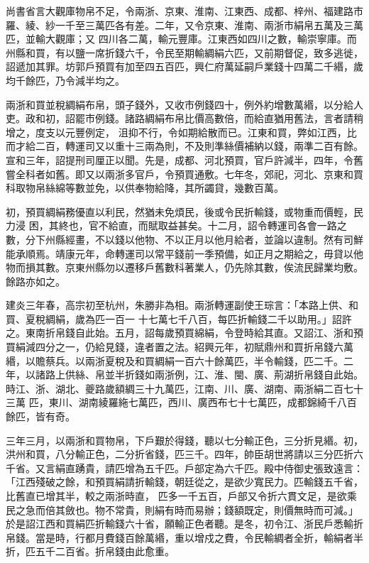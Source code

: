 \begin{pinyinscope}
 尚書省言大觀庫物帛不足，令兩浙、京東、淮南、江東西、成都、梓州、福建路市羅、綾、紗一千至三萬匹各有差。二年，又令京東、淮南、兩浙市絹帛五萬及三萬匹，並輸大觀庫；又
 四川各二萬，輸元豐庫。江東西如四川之數，輸崇寧庫。而州縣和買，有以鹽一席折錢六千，令民至期輸綢絹六匹，又前期督促，致多逃徙，詔遞加其罪。坊郭戶預買有加至四五百匹，興仁府萬延嗣戶業錢十四萬二千緡，歲均千餘匹，乃令減半均之。



 兩浙和買並稅綢絹布帛，頭子錢外，又收市例錢四十，例外約增數萬緡，以分給人吏。政和初，詔罷市例錢。諸路綢絹布帛比價高數倍，而給直猶用舊法，言者請稍增之，度支以元豐例定，
 沮抑不行，令如期給散而已。江東和買，弊如江西，比而才給二百，轉運司又以重十三兩為則，不及則準絲價補納以錢，兩準二百有餘。宣和三年，詔提刑司厘正以聞。先是，成都、河北預買，官戶許減半，四年，令舊嘗全科者如舊。即又以兩浙多官戶，令預買通敷。七年冬，郊祀，河北、京東和買科取物帛絲綿等數並免，以供奉物給降，其所蠲貸，幾數百萬。



 初，預買綢絹務優直以利民，然猶未免煩民，後或令民折輸錢，或物重而價輕，民力浸
 困，其終也，官不給直，而賦取益甚矣。十二月，詔令轉運司各會一路之數，分下州縣經畫，不以錢以他物、不以正月以他月給者，並論以違制。然有司鮮能承順焉。靖康元年，命轉運司以常平錢前一季預備，如正月之期給之，毋貸以他物而損其數。京東州縣勿以遷移戶舊數科著業人，仍先除其數，俟流民歸業均敷。餘路亦如之。



 建炎三年春，高宗初至杭州，朱勝非為相。兩浙轉運副使王琮言：「本路上供、和買、夏稅綢絹，歲為匹一百一
 十七萬七千八百，每匹折輸錢二千以助用。」詔許之。東南折帛錢自此始。五月，詔每歲預買綿絹，令登時給其直。又詔江、浙和預買絹減四分之一，仍給見錢，違者置之法。紹興元年，初賦鼎州和買折帛錢六萬緡，以贍蔡兵。以兩浙夏稅及和買綢絹一百六十餘萬匹，半令輸錢，匹二千。二年，以諸路上供絲、帛並半折錢如兩浙例，江、淮、閩、廣、荊湖折帛錢自此始。時江、浙、湖北、夔路歲額綢三十九萬匹，江南、川、廣、湖南、兩浙絹二百七十三萬
 匹，東川、湖南綾羅絁七萬匹，西川、廣西布七十七萬匹，成都錦綺千八百餘匹，皆有奇。



 三年三月，以兩浙和買物帛，下戶艱於得錢，聽以七分輸正色，三分折見緡。初，洪州和買，八分輸正色，二分折省錢，匹三千。四年，帥臣胡世將請以三分匹折六千省。又言絹直踴貴，請匹增為五千匹。戶部定為六千匹。殿中侍御史張致遠言：「江西殘破之餘，和預買絹請折輸錢，朝廷從之，是欲少寬民力。匹輸錢五千省，比舊直已增其半，較之兩浙時直，
 匹多一千五百，戶部又令折六貫文足，是欲乘民之急而倍其斂也。物不常貴，則絹有時而易辦；錢額既定，則價無時而可減。」於是詔江西和買絹匹折輸錢六十省，願輸正色者聽。是冬，初令江、浙民戶悉輸折帛錢。當是時，行都月費錢百餘萬緡，重以增戍之費，令民輸綢者全折，輸絹者半折，匹五千二百省。折帛錢由此愈重。




\end{pinyinscope}
